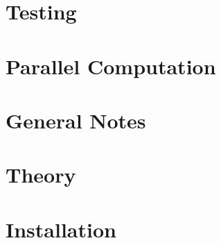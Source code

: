 \documentclass{article}
\numberwithin{equation}{section}
\begin{document}
\section{Testing}\label{sec:test}


\section{Parallel Computation}\label{sec:parallel}


\section{General Notes}\label{sec:general_notes}


\section{Theory}\label{sec:theory}


\section{Installation}\label{sec:install}

\end{document}
